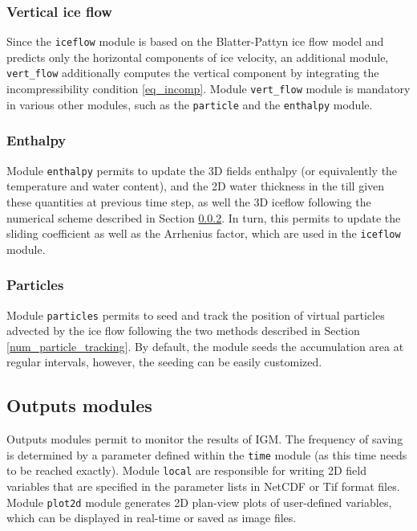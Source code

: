 \documentclass[gmd]{copernicus}
\begin{document}
\subsubsection{Vertical ice flow}
\label{module_vertical}

Since the \texttt{iceflow} module is based on the Blatter-Pattyn ice flow model and predicts only the horizontal components of ice velocity, an additional module, \texttt{vert\_flow} additionally computes the vertical component by integrating the incompressibility condition \eqref{eq_incomp}. Module \texttt{vert\_flow} module is mandatory in various other modules, such as the \texttt{particle} and the \texttt{enthalpy} module.

\subsubsection{Enthalpy}
\label{module_enthalpy}

Module \texttt{enthalpy} permits to update the 3D fields enthalpy (or equivalently the temperature and water content), and the 2D water thickness in the till given these quantities at previous time step, as well the 3D iceflow following the numerical scheme described in Section \ref{module_enthalpy}. In turn, this permits to update the sliding coefficient as well as the Arrhenius factor, which are used in the \texttt{iceflow} module.
\subsubsection{Particles}
\label{module_particles}

Module \texttt{particles} permits to seed and track the position of virtual particles advected by the ice flow following the two methods described in Section \ref{num_particle_tracking}. By default, the module seeds the accumulation area at regular intervals, however, the seeding can be easily customized.

\subsection{Outputs modules}

Outputs modules permit to monitor the results of IGM. The frequency of saving is determined by a parameter defined within the \texttt{time} module (as this time needs to be reached exactly). Module \texttt{local} are responsible for writing 2D field variables that are specified in the parameter lists in NetCDF or Tif format files. Module \texttt{plot2d} module generates 2D plan-view plots of user-defined variables, which can be displayed in real-time or saved as image files. 
\end{document}
